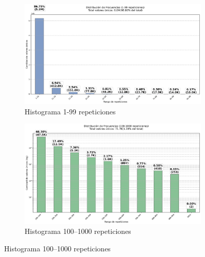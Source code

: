 \begin{figure}[H]
    \centering
    \begin{subfigure}[t]{0.48\textwidth-1em}
        \includegraphics[width=\linewidth]{img/histograma_1-99_identifier_Mobility_Data_Slim_DeDuplicate.png}
        \caption{Histograma 1-99 repeticiones}
        \label{fig:sub1}
    \end{subfigure}
    \hfill
    \begin{subfigure}[t]{0.48\textwidth-1em}
        \includegraphics[width=\linewidth]{img/histograma_100-1k_identifier_Mobility_Data_Slim_DeDuplicate.png}
        \caption{Histograma 100–1000 repeticiones}
        \label{fig:sub2}
    \end{subfigure}

    \vspace{0.5cm}


\end{figure}
